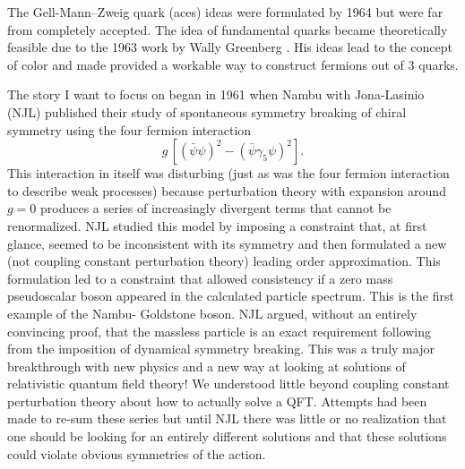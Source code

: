 \documentclass[preprintnumbers,12pt]{revtex4-2}
\begin{document}
The Gell-Mann--Zweig quark (aces) ideas were formulated by 1964
\cite{gm;1964,gz;1964} but were far from completely accepted. The idea
of fundamental quarks became theoretically feasible due to the 1963
work by Wally Greenberg \cite{wag;1964}. His ideas lead to the concept
of color and made provided a workable way to construct fermions out of
3 quarks.

The story I want to focus on began in 1961 when Nambu with
Jona-Lasinio (NJL)  published \cite{nb;1960,nb;1961} their study of
spontaneous symmetry breaking of chiral symmetry using the four fermion
interaction
\begin{equation*}
  g\, \left[ (\bar{\psi}\psi)^2 - (\bar{\psi}\gamma_{5}\psi)^2 \right].
\end{equation*}
This interaction in itself was disturbing (just as was the four
fermion interaction to describe weak processes) because perturbation
theory with expansion around $g=0$ produces a series of increasingly
divergent terms that cannot be renormalized. NJL studied this model by
imposing a constraint that, at first glance, seemed to be inconsistent
with its symmetry and then formulated a new (not coupling constant
perturbation theory) leading order approximation. This formulation led
to a constraint that allowed consistency if a zero mass pseudoscalar
boson appeared in the calculated particle spectrum. This is the first
example of the Nambu- Goldstone boson.  NJL argued, without an
entirely convincing proof, that the massless particle is an exact
requirement following from the imposition of dynamical symmetry
breaking. This was a truly major breakthrough with new physics and a
new way at looking at solutions of relativistic quantum field theory!
We understood little beyond coupling constant perturbation theory
about how to actually solve a QFT. Attempts had been made to re-sum
these series but until NJL there was little or no realization that one
should be looking for an entirely different solutions and that these solutions could violate
obvious symmetries of the action.
\end{document}
